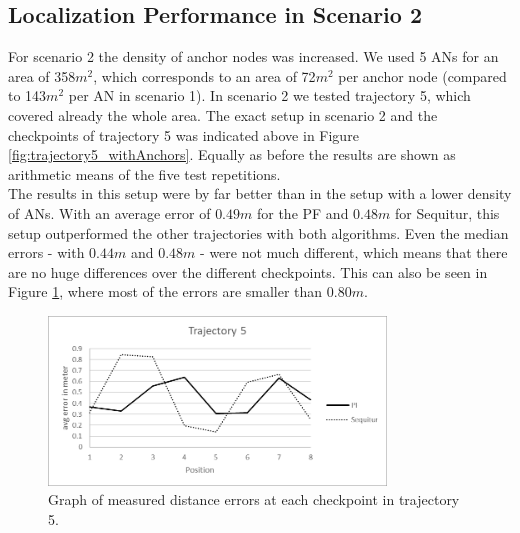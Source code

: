 
\subsection{Localization Performance in Scenario 2}
For scenario 2 the density of anchor nodes was increased. We used 5 ANs for an area of 358$m^2$, which corresponds to an area of 72$m^2$ per anchor node (compared to 143$m^2$ per AN in scenario 1). In scenario 2 we tested trajectory 5, which covered already the whole area. The exact setup in scenario 2 and the checkpoints of trajectory 5 was indicated above in Figure \ref{fig:trajectory5_withAnchors}. Equally as before the results are shown as arithmetic means of the five test repetitions.\\
\noindent\hspace*{5mm}%
The results in this setup were by far better than in the setup with a lower density of ANs. With an average error of $0.49m$ for the PF and $0.48m$ for Sequitur, this setup outperformed the other trajectories with both algorithms. Even the median errors - with $0.44m$ and $0.48m$ -  were not much different, which means that there are no huge differences over the different checkpoints. This can also be seen in Figure \ref{fig:trajectory5_results}, where most of the errors are smaller than $0.80m$.

\begin{figure}[th]
\centering
\includegraphics[width=0.8\textwidth]{Figures/trajectory5_results}
\decoRule
\caption[Positioning Results Trajectory 5]{Graph of measured distance errors at each checkpoint in trajectory 5.}
\label{fig:trajectory5_results}
\end{figure}

